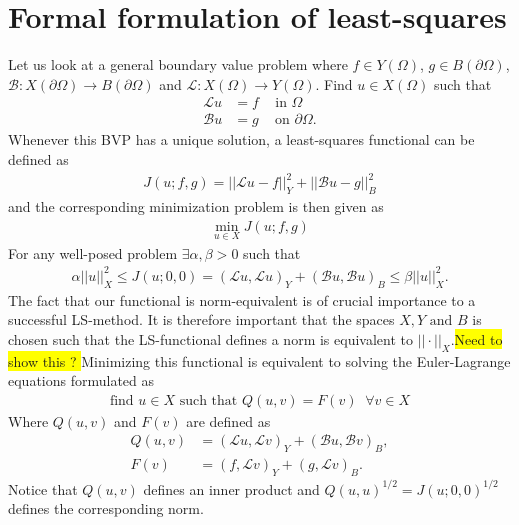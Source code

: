 \section{ Formal formulation of least-squares}
Let us look at a general boundary value problem where $f \in Y(\Omega)$, $g \in B(\partial \Omega)$, $\mathcal{B}\colon X(\partial \Omega) \to B(\partial\Omega) $ and $\mathcal{L}\colon X(\Omega)\to Y(\Omega)$. Find $u \in X(\Omega) $ such that 
\begin{align}
	\mathcal{L} u &= f \; \; \; \text{ in } \Omega \\
	\mathcal{B}u &= g \; \; \; \text{ on } \partial \Omega.
	\label{eq:BVP}
\end{align}
Whenever this BVP has a unique solution, a least-squares functional can be defined as 
\begin{align}
	J(u;f,g) = ||\mathcal{L}u-f||^2_Y + ||\mathcal{B}u-g||^2_B
	\label{eq:FunctionalGen}
\end{align}
and the corresponding minimization problem is then given as 
\begin{align}
	\min_{u \in X}J(u;f,g)
	\label{eq:minProbGen}
\end{align}
For any well-posed problem $\exists \alpha,\beta > 0$ such that 
\begin{align}
	\alpha||u||_X^2 \leq J(u;0,0) = (\mathcal{L}u,\mathcal{L}u)_Y+(\mathcal{B}u,\mathcal{B}u)_B \leq \beta||u||_X^2.
	\label{eq:normEq}
\end{align}
The fact that our functional is norm-equivalent is of crucial importance to a successful LS-method. It is therefore important that the spaces $X,Y \text{ and } B$ is chosen such that the LS-functional defines a norm is equivalent to $|| \cdot ||_X$.\colorbox{yellow}{Need to show this ? }
Minimizing this functional is equivalent to solving the Euler-Lagrange equations formulated as 
\begin{align}
	\text{find } u \in X \text{  such that  } Q(u,v) = F(v) \; \; \forall v\in X
	\label{eq:varFormGen}
\end{align}
Where $Q(u,v)$ and $F(v)$ are defined as 
\begin{align}
	Q(u,v) &= (\mathcal{L}u,\mathcal{L}v)_Y+(\mathcal{B}u,\mathcal{B}v)_B, \\
	F(v) &= (f,\mathcal{L}v)_Y+(g,\mathcal{L}v)_B.
	\label{VarFormLinForms}
\end{align}
%
Notice that $Q(u,v)$ defines an inner product and $Q(u,u)^{1/2}=J(u;0,0)^{1/2}$ defines the corresponding norm. 

